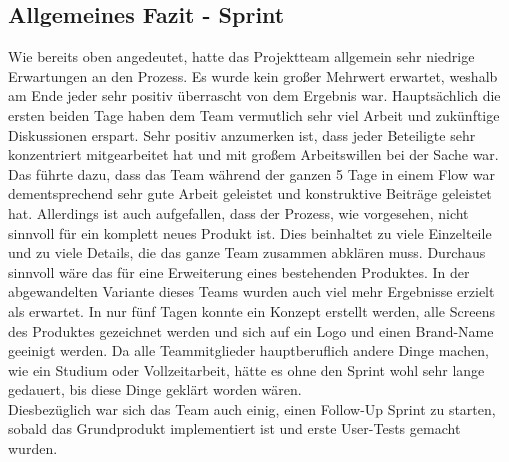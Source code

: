 \subsection*{Allgemeines Fazit - Sprint}
Wie bereits oben angedeutet, hatte das Projektteam allgemein sehr niedrige Erwartungen an den Prozess. Es wurde kein großer Mehrwert erwartet, weshalb am Ende jeder sehr positiv überrascht von dem Ergebnis war. Hauptsächlich die ersten beiden Tage haben dem Team vermutlich sehr viel Arbeit und zukünftige Diskussionen erspart. Sehr positiv anzumerken ist, dass jeder Beteiligte sehr konzentriert mitgearbeitet hat und mit großem Arbeitswillen bei der Sache war. Das führte dazu, dass das Team während der ganzen 5 Tage in einem Flow war dementsprechend sehr gute Arbeit geleistet und konstruktive Beiträge geleistet hat. Allerdings ist auch aufgefallen, dass der Prozess, wie vorgesehen, nicht sinnvoll für ein komplett neues Produkt ist. Dies beinhaltet zu viele Einzelteile und zu viele Details, die das ganze Team zusammen abklären muss. Durchaus sinnvoll wäre das für eine Erweiterung eines bestehenden Produktes. In der abgewandelten Variante dieses Teams wurden auch viel mehr Ergebnisse erzielt als erwartet. In nur fünf Tagen konnte ein Konzept erstellt werden, alle Screens des Produktes gezeichnet werden und sich auf ein Logo und einen Brand-Name geeinigt werden. Da alle Teammitglieder hauptberuflich andere Dinge machen, wie ein Studium oder Vollzeitarbeit, hätte es ohne den Sprint wohl sehr lange gedauert, bis diese Dinge geklärt worden wären. \\
Diesbezüglich war sich das Team auch einig, einen Follow-Up Sprint zu starten, sobald das Grundprodukt implementiert ist und erste User-Tests gemacht wurden. 